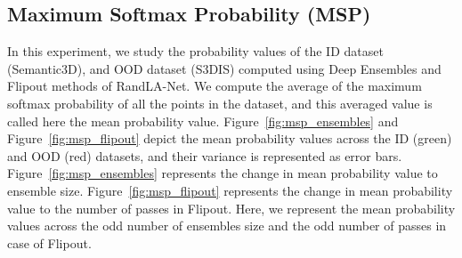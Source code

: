     \subsection{Maximum Softmax Probability (MSP)}
    \label{sec:prob_sem3dvs3dis}
    In this experiment, we study the probability values of the ID dataset (Semantic3D), and OOD dataset (S3DIS) computed using Deep Ensembles and Flipout methods of RandLA-Net.
    We compute the average of the maximum softmax probability of all the points in the dataset, and this averaged value is called here the mean probability value.
    Figure~\ref{fig:msp_ensembles} and Figure~\ref{fig:msp_flipout} depict the mean probability values across the ID (green) and OOD (red) datasets, and their variance is represented as error bars.
    Figure~\ref{fig:msp_ensembles} represents the change in mean probability value to ensemble size.
    Figure~\ref{fig:msp_flipout} represents the change in mean probability value to the number of passes in Flipout.
    Here, we represent the mean probability values across the odd number of ensembles size and the odd number of passes in case of Flipout.
